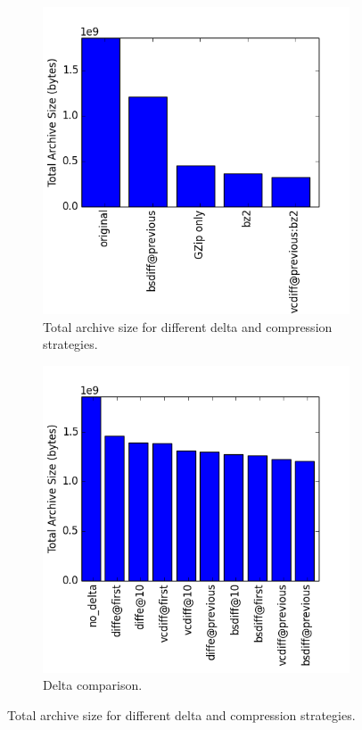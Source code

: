 \documentclass[11pt]{article}
\begin{document}
    \begin{figure}
    \centering
    \begin{subfigure}{.5\textwidth}
      \centering
      \includegraphics[width=\linewidth]{images/tas_best.png}
      \caption{Total archive size for different delta and compression strategies.}
      \label{fig:tas_best}
    \end{subfigure}%
    \begin{subfigure}{.5\textwidth}
      \centering
      \includegraphics[width=\linewidth]{images/tas_delta.png}
      \caption{Delta comparison.}
      \label{fig:tas_delta_compression:b}
    \end{subfigure}
    \caption{Total archive size for different delta and compression strategies.}
    \label{fig:tas_delta_compression}
    \end{figure}
\end{document}
